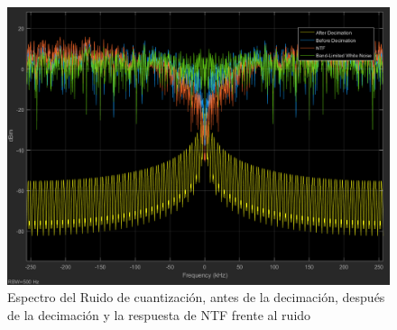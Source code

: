 \documentclass[assd_tp3_main.tex]{subfiles}
\begin{document}
\begin{figure}[H]
\centering
\includegraphics[width=1\linewidth]{images/ej4/NTF.png}
\caption{Espectro del Ruido de cuantización, antes de la decimación, después de la decimación y la respuesta de NTF frente al ruido}
\label{fig:NTF}
\end{figure}
\end{document}
